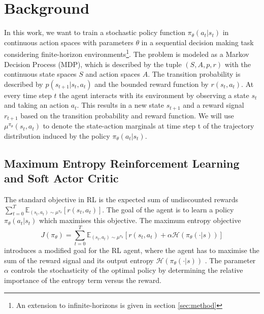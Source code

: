 \documentclass{article}
\begin{document}
\section{Background}\label{sec:back}

In this work, we want to train a stochastic policy function $\pi_{\theta}(a_t|s_t)$ in continuous action spaces with parameters $\theta$ in a sequential decision making task considering finite-horizon environments\footnote{An extension to infinite-horizons is given in section \ref{sec:method}}. 
The problem is modeled as a Markov Decision Process (MDP), which is described by the tuple $(S, A, p, r)$ with the continuous state spaces $S$ and action spaces $A$. The transition probability is described by $p(s_{t+1}|s_t, a_t)$ and the bounded reward function by $r(s_t, a_t)$. At every time step $t$ the agent interacts with its environment by observing a state $s_t$ and taking an action $a_t$. This results in a new state $s_{t+1}$ and a reward signal $r_{t+1}$ based on the transition probability and reward function. We will use $\mu^{\pi_{\theta}}(s_t,a_t)$ to denote the state-action marginals at time step t of the trajectory distribution induced by the policy $\pi_{\theta}(a_t|s_t)$.  

\subsection{Maximum Entropy Reinforcement Learning and Soft Actor Critic}\label{sec:sac}

The standard objective in RL is the expected sum of undiscounted rewards $\sum_{t=0}^{T}\mathbb{E}_{(s_t,a_t) \sim \mu^{\pi_{\theta}}}[r(s_t, a_t)]$. The goal of the agent is to learn a policy $\pi_{\theta}(a_t|s_t)$ which maximises this objective. The maximum entropy objective 
\begin{equation}
    J(\pi_{\theta})=\sum_{t=0}^{T}\mathbb{E}_{(s_t,a_t) \sim \mu^{\pi_{\theta}}}[r(s_t, a_t)+\alpha \mathcal{H}(\pi_{\theta}(\cdot |s))]
\end{equation}
introduces a modified goal for the RL agent, where the agent has to maximise the sum of the reward signal and its output entropy $\mathcal{H}(\pi_{\theta}(\cdot |s))$ \cite{Ziebart2010}. The parameter $\alpha$ controls the stochasticity of the optimal policy by determining the relative importance of the entropy term versus the reward. 
\end{document}
